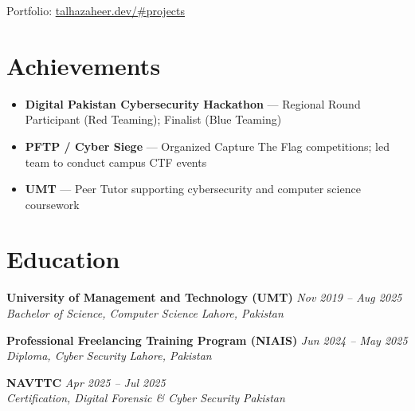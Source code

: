 \documentclass[11pt,a4paper]{article}
\newcommand{\resumeSubheading}[4]{%
  \textbf{#1} \hfill \textit{#2} \\
  \textit{#3} \hfill \textit{#4} \\
}
\begin{document}
{\small Portfolio: \href{https://talhazaheer.dev/\#projects}{talhazaheer.dev/\#projects}}

\section{Achievements}
\begin{itemize}[leftmargin=*, nosep]
  \item \textbf{Digital Pakistan Cybersecurity Hackathon} --- Regional Round Participant (Red Teaming); Finalist (Blue Teaming)
  \item \textbf{PFTP / Cyber Siege} --- Organized Capture The Flag competitions; led team to conduct campus CTF events
  \item \textbf{UMT} --- Peer Tutor supporting cybersecurity and computer science coursework
\end{itemize}

\section{Education}

\resumeSubheading{University of Management and Technology (UMT)}{Nov 2019 -- Aug 2025}{Bachelor of Science, Computer Science}{Lahore, Pakistan}

\vspace{4pt}

\resumeSubheading{Professional Freelancing Training Program (NIAIS)}{Jun 2024 -- May 2025}{Diploma, Cyber Security}{Lahore, Pakistan}

\vspace{4pt}

\resumeSubheading{NAVTTC}{Apr 2025 -- Jul 2025}{Certification, Digital Forensic \& Cyber Security}{Pakistan}
\end{document}
